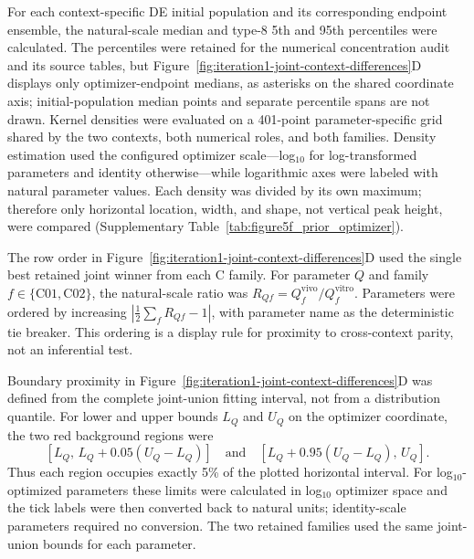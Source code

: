\documentclass[11pt]{article}
\begin{document}
For each context-specific DE initial population and its corresponding endpoint ensemble, the natural-scale median and type-8 5th and 95th percentiles were calculated. The percentiles were retained for the numerical concentration audit and its source tables, but Figure~\ref{fig:iteration1-joint-context-differences}D displays only optimizer-endpoint medians, as asterisks on the shared coordinate axis; initial-population median points and separate percentile spans are not drawn. Kernel densities were evaluated on a 401-point parameter-specific grid shared by the two contexts, both numerical roles, and both families. Density estimation used the configured optimizer scale---log$_{10}$ for log-transformed parameters and identity otherwise---while logarithmic axes were labeled with natural parameter values. Each density was divided by its own maximum; therefore only horizontal location, width, and shape, not vertical peak height, were compared (Supplementary Table~\ref{tab:figure5f_prior_optimizer}).

The row order in Figure~\ref{fig:iteration1-joint-context-differences}D used the single best retained joint winner from each C family. For parameter \(Q\) and family \(f\in\{\mathrm{C01},\mathrm{C02}\}\), the natural-scale ratio was \(R_{Qf}=Q_f^{\mathrm{vivo}}/Q_f^{\mathrm{vitro}}\). Parameters were ordered by increasing \(\left|\frac{1}{2}\sum_f R_{Qf}-1\right|\), with parameter name as the deterministic tie breaker. This ordering is a display rule for proximity to cross-context parity, not an inferential test.

Boundary proximity in Figure~\ref{fig:iteration1-joint-context-differences}D was defined from the complete joint-union fitting interval, not from a distribution quantile. For lower and upper bounds $L_Q$ and $U_Q$ on the optimizer coordinate, the two red background regions were
\begin{equation}
\left[L_Q,\,L_Q+0.05(U_Q-L_Q)\right]
\quad\text{and}\quad
\left[L_Q+0.95(U_Q-L_Q),\,U_Q\right].
\label{eq:appendix_figure5d_bound_bands}
\end{equation}
Thus each region occupies exactly 5\% of the plotted horizontal interval. For log$_{10}$-optimized parameters these limits were calculated in log$_{10}$ optimizer space and the tick labels were then converted back to natural units; identity-scale parameters required no conversion. The two retained families used the same joint-union bounds for each parameter.
\end{document}
